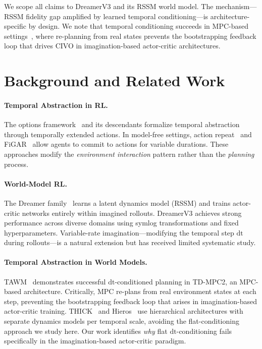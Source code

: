\documentclass{article}
\newcommand{\dt}{\mathrm{dt}}
\begin{document}
We scope all claims to DreamerV3 and its RSSM world model.
The mechanism---RSSM fidelity gap amplified by learned temporal conditioning---is architecture-specific by design.
We note that temporal conditioning succeeds in MPC-based settings~\cite{nhu2025tawm}, where re-planning from real states prevents the bootstrapping feedback loop that drives CIVO in imagination-based actor-critic architectures.

\section{Background and Related Work}

\paragraph{Temporal Abstraction in RL.}
The options framework~\cite{sutton1999options} and its descendants formalize temporal abstraction through temporally extended actions.
In model-free settings, action repeat~\cite{lakshminarayanan2017dynamic} and FiGAR~\cite{sharma2017figar} allow agents to commit to actions for variable durations.
These approaches modify the \emph{environment interaction} pattern rather than the \emph{planning} process.

\paragraph{World-Model RL.}
The Dreamer family~\cite{hafner2020dream,hafner2021dreamerv2,hafner2023dreamerv3} learns a latent dynamics model (RSSM) and trains actor-critic networks entirely within imagined rollouts.
DreamerV3 achieves strong performance across diverse domains using symlog transformations and fixed hyperparameters.
Variable-rate imagination---modifying the temporal step $\dt$ during rollouts---is a natural extension but has received limited systematic study.

\paragraph{Temporal Abstraction in World Models.}
TAWM~\cite{nhu2025tawm} demonstrates successful $\dt$-conditioned planning in TD-MPC2, an MPC-based architecture.
Critically, MPC re-plans from real environment states at each step, preventing the bootstrapping feedback loop that arises in imagination-based actor-critic training.
THICK~\cite{kim2023thick} and Hieros~\cite{hieros2024} use hierarchical architectures with separate dynamics models per temporal scale, avoiding the flat-conditioning approach we study here.
Our work identifies \emph{why} flat $\dt$-conditioning fails specifically in the imagination-based actor-critic paradigm.
\end{document}
